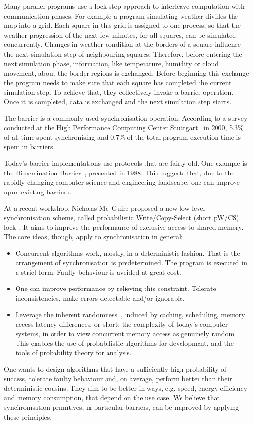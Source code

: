 \documentclass[a4paper, 10pt]{article}
\begin{document}
Many parallel programs use a lock-step approach to interleave computation with communication phases.
For example a program simulating weather divides the map into a grid.
Each square in this grid is assigned to one process, so that the weather progression of the next few minutes, for all squares, can be simulated concurrently.
Changes in weather condition at the borders of a square influence the next simulation step of neighbouring squares.
Therefore, before entering the next simulation phase, information, like temperature, humidity or cloud movement, about the border regions is exchanged.
Before beginning this exchange the program needs to make sure that each square has completed the current simulation step. To achieve that, they collectively invoke a barrier operation.
Once it is completed, data is exchanged and the next simulation step starts.

The barrier is a commonly used synchronisation operation. According to a survey conducted at the High Performance Computing Center Stuttgart~\cite{rab00} in 2000, 5.3\% of all time spent synchronising and 0.7\% of the total program execution time is spent in barriers.

Today's barrier implementations use protocols that are fairly old. One example is the Dissemination Barrier~\cite{hensgen1988}, presented in 1988. This suggests that, due to the rapidly changing computer science and engineering landscape, one can improve upon existing barriers.

At a recent workshop, Nicholas Mc~Guire proposed a new low-level synchronisation scheme, called probabilistic Write/Copy-Select (short pW/CS) lock~\cite{pwcs}. It aims to improve the performance of exclusive access to shared memory. The core ideas, though, apply to synchronisation in general:
\begin{itemize}
	\item Concurrent algorithms work, mostly, in a deterministic fashion. That is the arrangement of synchronisation is predetermined. The program is executed in a strict form. Faulty behaviour is avoided at great cost.
	\item One can improve performance by relieving this constraint. Tolerate inconsistencies, make errors detectable and/or ignorable.
	\item Leverage the inherent randomness~\cite{mcg09}, induced by caching, scheduling, memory access latency differences, or short: the complexity of today's computer systems, in order to view concurrent memory access as genuinely random. This enables the use of probabilistic algorithms for development, and the tools of probability theory for analysis.
\end{itemize}
One wants to design algorithms that have a sufficiently high probability of success, tolerate faulty behaviour and, on average, perform better than their deterministic cousins. They aim to be better in ways, e.g. speed, energy efficiency and memory consumption, that depend on the use case.
We believe that synchronisation primitives, in particular barriers, can be improved by applying these principles.
\end{document}

